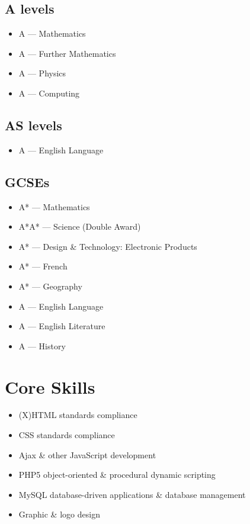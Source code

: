 \documentclass{cv}
\begin{document}
\subsection*{A levels}

\begin{itemize}
\item A --- Mathematics
\item A --- Further Mathematics
\item A --- Physics
\item A --- Computing
\end{itemize}

\subsection*{AS levels}

\begin{itemize}
\item A --- English Language
\end{itemize}

\subsection*{GCSEs}

\begin{itemize}
\item A* --- Mathematics
\item A*A* --- Science (Double Award)
\item A* --- Design \& Technology: Electronic Products
\item A* --- French
\item A* --- Geography
\item A --- English Language
\item A --- English Literature
\item A --- History
\end{itemize}

\section{Core Skills}

\begin{itemize}
\item (X)HTML standards compliance
\item CSS standards compliance
\item Ajax \& other JavaScript development
\item PHP5 object-oriented \& procedural dynamic scripting
\item MySQL database-driven applications \& database management
\item Graphic \& logo design
\end{itemize}
\end{document}
